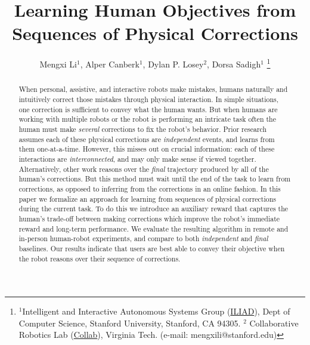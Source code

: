 \documentclass[letterpaper, 10 pt, conference]{ieeeconf}  %
\title{\LARGE \bf
Learning Human Objectives from Sequences of Physical Corrections
}
\author{Mengxi Li$^{1}$, Alper Canberk$^{1}$, Dylan P. Losey$^{2}$, Dorsa Sadigh$^{1}$
\thanks{$^{1}$Intelligent and Interactive Autonomous Systems Group (\href{https://iliad.stanford.edu/}{ILIAD}), Dept of Computer Science, Stanford University, Stanford, CA 94305. \newline
$^{2}$ Collaborative Robotics Lab (\href{https://collab.me.vt.edu/}{Collab}), Virginia Tech.
\newline
{(e-mail: mengxili@stanford.edu)}}%
}
\theoremstyle{exampstyle}
\begin{document}
\maketitle
\thispagestyle{empty}
\pagestyle{empty}


\begin{abstract}

When personal, assistive, and interactive robots make mistakes, humans naturally and intuitively correct those mistakes through physical interaction. In simple situations, one correction is sufficient to convey what the human wants. But when humans are working with multiple robots or the robot is performing an intricate task often the human must make \textit{several} corrections to fix the robot's behavior. Prior research assumes each of these physical corrections are \textit{independent} events, and learns from them one-at-a-time. However, this misses out on crucial information: each of these interactions are \textit{interconnected}, and may only make sense if viewed together. Alternatively, other work reasons over the \textit{final} trajectory produced by all of the human's corrections. But this method must wait until the end of the task to learn from corrections, as opposed to inferring from the corrections in an online fashion. In this paper we formalize an approach for learning from sequences of physical corrections during the current task. To do this we introduce an auxiliary reward that captures the human's trade-off between making corrections which improve the robot's immediate reward and long-term performance. We evaluate the resulting algorithm in remote and in-person human-robot experiments, and compare to both \textit{independent} and \textit{final} baselines. Our results indicate that users are best able to convey their objective when the robot reasons over their sequence of corrections.

\end{abstract}














\end{document}

